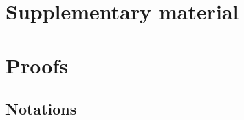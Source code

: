 \onecolumn
\section*{Supplementary material}

\section{Proofs}
\label{sec:proofs}

\subsection{Notations}



